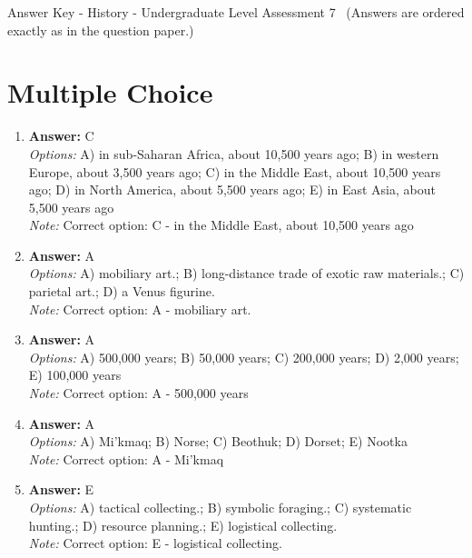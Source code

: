 \documentclass[12pt]{article}
\begin{document}
\begin{center}
Answer Key - History - Undergraduate Level Assessment 7 \
\small (Answers are ordered exactly as in the question paper.)
\end{center}

\section*{Multiple Choice}
\begin{enumerate}[label=\arabic*.]
\item \textbf{Answer:} C
\\ \textit{Options:} A) in sub-Saharan Africa, about 10,500 years ago; B) in western Europe, about 3,500 years ago; C) in the Middle East, about 10,500 years ago; D) in North America, about 5,500 years ago; E) in East Asia, about 5,500 years ago
\\ \textit{Note:} Correct option: C - in the Middle East, about 10,500 years ago
\item \textbf{Answer:} A
\\ \textit{Options:} A) mobiliary art.; B) long-distance trade of exotic raw materials.; C) parietal art.; D) a Venus figurine.
\\ \textit{Note:} Correct option: A - mobiliary art.
\item \textbf{Answer:} A
\\ \textit{Options:} A) 500,000 years; B) 50,000 years; C) 200,000 years; D) 2,000 years; E) 100,000 years
\\ \textit{Note:} Correct option: A - 500,000 years
\item \textbf{Answer:} A
\\ \textit{Options:} A) Mi'kmaq; B) Norse; C) Beothuk; D) Dorset; E) Nootka
\\ \textit{Note:} Correct option: A - Mi'kmaq
\item \textbf{Answer:} E
\\ \textit{Options:} A) tactical collecting.; B) symbolic foraging.; C) systematic hunting.; D) resource planning.; E) logistical collecting.
\\ \textit{Note:} Correct option: E - logistical collecting.
\end{enumerate}
\end{document}
